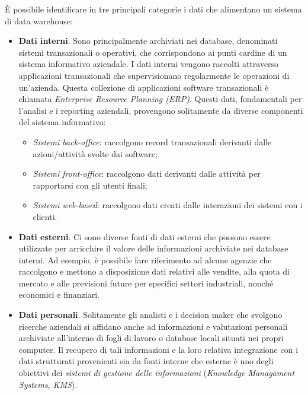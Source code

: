 È possibile identificare in tre principali categorie i dati che alimentano un sistema di data warehouse:\cite{vercellis_business_intelligence}
\begin{itemize}
    \item \textbf{Dati interni}. Sono principalmente archiviati nei database, denominati sistemi transazionali o operativi, che corrispondono ai punti cardine di un sistema informativo aziendale. I dati interni vengono raccolti attraverso applicazioni transazionali che supervisionano regolarmente le operazioni di un’azienda. Questa collezione di applicazioni software transazionali è chiamata \textit{Enterprise Resource Planning (ERP)}. Questi dati, fondamentali per l’analisi e i reporting aziendali, provengono solitamente da diverse componenti del sistema informativo:
        \begin{itemize}
            \item \textit{Sistemi back-office}: raccolgono record transazionali derivanti dalle azioni/attività svolte dai software;
            \item \textit{Sistemi front-office}: raccolgono dati derivanti dalle attività per rapportarsi con gli utenti finali;
            \item \textit{Sistemi web-based}: raccolgono dati creati dalle interazioni dei sistemi con i clienti.
        \end{itemize}
    \item \textbf{Dati esterni}. Ci sono diverse fonti di dati esterni che possono essere utilizzate per arricchire il valore delle informazioni archiviate nei database interni. Ad esempio, è possibile fare riferimento ad alcune agenzie che raccolgono e mettono a disposizione dati relativi alle vendite, alla quota di mercato e alle previsioni future per specifici settori industriali, nonché economici e finanziari. 
    \item \textbf{Dati personali}. Solitamente gli analisti e i decision maker che svolgono ricerche aziendali si affidano anche ad informazioni e valutazioni personali archiviate all’interno di fogli di lavoro o database locali situati nei propri computer. Il recupero di tali informazioni e la loro relativa integrazione con i dati strutturati provenienti sia da fonti interne che esterne è uno degli obiettivi dei \textit{sistemi di gestione delle informazioni} (\textit{Knowledge Managament Systems, KMS}).
\end{itemize}

